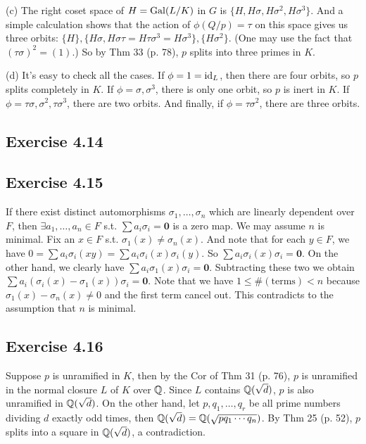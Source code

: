 \documentclass[../Marcus.tex]{subfiles}
\begin{document}
(c) The right coset space of $H=\operatorname{Gal}(L/K)$ in $G$ is $\{H,H\sigma,H\sigma^2,H\sigma^3\}$. And a simple calculation shows that the action of $\phi(Q/p)=\tau$ on this space gives us three orbits: $\{H\},\{H\sigma,H\sigma\tau=H\tau\sigma^3=H\sigma^3\},\{H\sigma^2\}$. (One may use the fact that $(\tau\sigma)^2=(1)$.) So by Thm 33 (p. 78), $p$ splits into three primes in $K$.

(d) It's easy to check all the cases. If $\phi=1=\operatorname{id}_L$, then there are four orbits, so $p$ splits completely in $K$. If $\phi=\sigma,\sigma^3$, there is only one orbit, so $p$ is inert in $K$. If $\phi=\tau\sigma,\sigma^2,\tau\sigma^3$, there are two orbits. And finally, if $\phi=\tau\sigma^2$, there are three orbits.

\subsection*{Exercise 4.14}

\subsection*{Exercise 4.15}

If there exist distinct automorphisms $\sigma_1,\ldots,\sigma_n$ which are linearly dependent over $F$, then $\exists a_1,\ldots,a_n\in F$ s.t. $\sum a_i\sigma_i=\mathbf{0}$ is a zero map. We may assume $n$ is minimal. Fix an $x\in F$ s.t. $\sigma_1(x)\neq\sigma_n(x)$. And note that for each $y\in F$, we have $0=\sum a_i\sigma_i(xy)=\sum a_i\sigma_i(x)\sigma_i(y)$. So $\sum a_i\sigma_i(x)\sigma_i=\mathbf{0}$. On the other hand, we clearly have $\sum a_i\sigma_1(x)\sigma_i=\mathbf{0}$. Subtracting these two we obtain $\sum a_i(\sigma_i(x)-\sigma_1(x))\sigma_i=\mathbf{0}$. Note that we have $1\leq\#(\text{terms})<n$ because $\sigma_1(x)-\sigma_n(x)\neq 0$ and the first term cancel out. This contradicts to the assumption that $n$ is minimal.

\subsection*{Exercise 4.16}

Suppose $p$ is unramified in $K$, then by the Cor of Thm 31 (p. 76), $p$ is unramified in the normal closure $L$ of $K$ over $\mathbb{Q}$. Since $L$ contains $\mathbb{Q}(\sqrt{d})$, $p$ is also unramified in $\mathbb{Q}(\sqrt{d})$. On the other hand, let $p,q_1,\ldots,q_r$ be all prime numbers dividing $d$ exactly odd times, then $\mathbb{Q}(\sqrt{d})=\mathbb{Q}(\sqrt{pq_1\cdots q_n})$. By Thm 25 (p. 52), $p$ splits into a square in $\mathbb{Q}(\sqrt{d})$, a contradiction.
\end{document}
